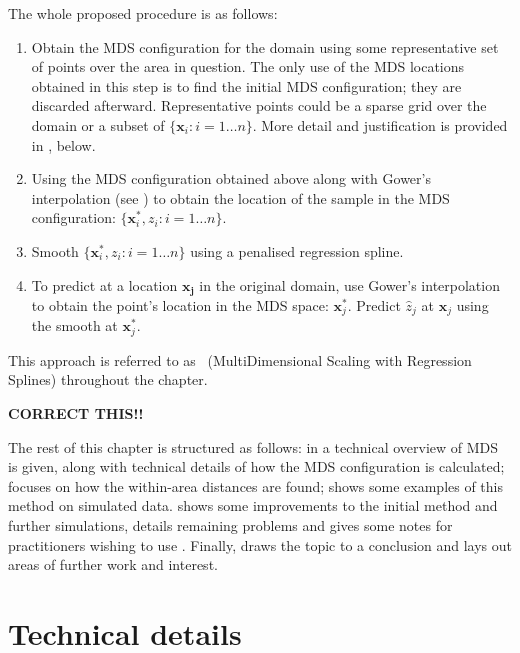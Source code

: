 The whole proposed procedure is as follows:

\begin{enumerate}
\item Obtain the MDS configuration for the domain using some representative set of points over the area in question. The only use of the MDS locations obtained in this step is to find the initial MDS configuration; they are discarded afterward. Representative points could be a sparse grid over the domain or a subset of $\{\bm{x}_i : i=1\dots n\}$. More detail and justification is provided in , below.

\item Using the MDS configuration obtained above along with Gower's interpolation (see ) to obtain the location of the sample in the MDS configuration: $\{\bm{x}_i^*, z_i : i=1\dots n\}$.

\item Smooth $\{\bm{x}_i^*, z_i : i=1\dots n\}$ using a penalised regression spline.

\item To predict at a location $\bm{x_j}$ in the original domain, use Gower's interpolation to obtain the point's location in the MDS space: $\bm{x}_j^*$. Predict $\hat{z}_j$ at $\bm{x}_j$ using the smooth at $\bm{x}_j^*$.
\end{enumerate}

This approach is referred to as \mdsap\ (MultiDimensional Scaling with Regression Splines) throughout the chapter.


\textbf{CORRECT THIS!!}

The rest of this chapter is structured as follows: in  a technical overview of MDS is given, along with technical details of how the MDS configuration is calculated;  focuses on how the within-area distances are found;  shows some examples of this method on simulated data.  shows some improvements to the initial method and further simulations,  details remaining problems and  gives some notes for practitioners wishing to use \mdsap. Finally,  draws the topic to a conclusion and lays out areas of further work and interest.


\section{Technical details}
\label{MDStechdet}

